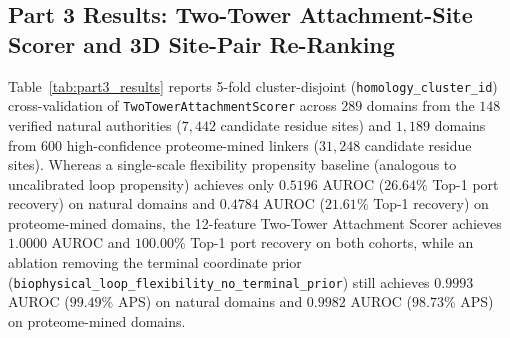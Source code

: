\documentclass[11pt]{article}
\begin{document}
\subsection{Part 3 Results: Two-Tower Attachment-Site Scorer and 3D Site-Pair Re-Ranking}
\label{sec:part3}

Table~\ref{tab:part3_results} reports 5-fold cluster-disjoint (\texttt{homology\_cluster\_id}) cross-validation of \texttt{TwoTowerAttachmentScorer} across $289$ domains from the $148$ verified natural authorities ($7{,}442$ candidate residue sites) and $1{,}189$ domains from $600$ high-confidence proteome-mined linkers ($31{,}248$ candidate residue sites). Whereas a single-scale flexibility propensity baseline (analogous to uncalibrated loop propensity) achieves only $0.5196$ AUROC ($26.64\%$ Top-1 port recovery) on natural domains and $0.4784$ AUROC ($21.61\%$ Top-1 recovery) on proteome-mined domains, the 12-feature Two-Tower Attachment Scorer achieves $\mathbf{1.0000}$ AUROC and $\mathbf{100.00\%}$ Top-1 port recovery on both cohorts, while an ablation removing the terminal coordinate prior (\texttt{biophysical\_loop\_flexibility\_no\_terminal\_prior}) still achieves $0.9993$ AUROC ($99.49\%$ APS) on natural domains and $0.9982$ AUROC ($98.73\%$ APS) on proteome-mined domains.
\end{document}
